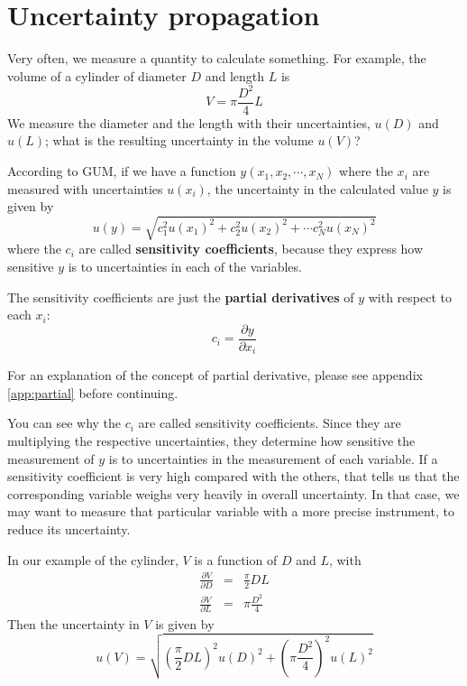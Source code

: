 \documentclass[justified]{tufte-handout}
\begin{document}
\section{Uncertainty propagation}
Very often, we measure a quantity to calculate something. For example,
the volume of a cylinder of diameter $D$ and length $L$ is 
\begin{equation}
  \label{eq:errors_2}
  V=\pi\frac{D^2}{4}L
\end{equation}
We measure the diameter and the length with their uncertainties,
$u(D)$ and $u(L)$; what is the resulting uncertainty in the volume
$u(V)$?

According to GUM, if we have a function $y(x_1,x_2,\cdots,x_N)$ where
the $x_i$ are measured with uncertainties $u(x_i)$, the uncertainty in
the calculated value $y$ is given by
\begin{equation}
  \label{eq:errors_3}
  u(y)=\sqrt{c_1^2u(x_1)^2+c_2^2u(x_2)^2+\cdots c_N^2u(x_N)^2}
\end{equation}
where the $c_i$ are called \textbf{sensitivity coefficients}, because
they express how sensitive $y$ is to uncertainties in each of the
variables. 

The sensitivity coefficients are just the \textbf{partial derivatives}
of $y$ with respect to each $x_i$:
\begin{equation}
  \label{eq:errors_4}
  c_i=\frac{\partial y}{\partial x_i}
\end{equation}

For an explanation of the concept of partial derivative, please see
 appendix \ref{app:partial} before continuing.

You can see why the $c_i$ are called sensitivity coefficients. Since
they are multiplying the respective uncertainties, they determine how
sensitive the measurement of $y$ is to uncertainties in the
measurement of each variable. If a sensitivity coefficient is very
high compared with the others, that tells us that the corresponding
variable weighs very heavily in overall uncertainty. In that case, we
may want to measure that particular variable with a more precise
instrument, to reduce its uncertainty. 

In our example of the cylinder, $V$ is a function of $D$ and $L$, with
\begin{eqnarray}
  \label{eq:errors_5}
  \frac{\partial V}{\partial D}&=&\frac{\pi}{2}DL\\
  \frac{\partial V}{\partial L}&=&\pi\frac{D^2}{4}
\end{eqnarray}
Then the uncertainty in $V$ is given by
\begin{equation}
  \label{eq:errors_6}
  u(V)=\sqrt{\left(\frac{\pi}{2}DL\right)^2u(D)^2+\left(\pi\frac{D^2}{4}\right)^2u(L)^2}
\end{equation}
\end{document}
